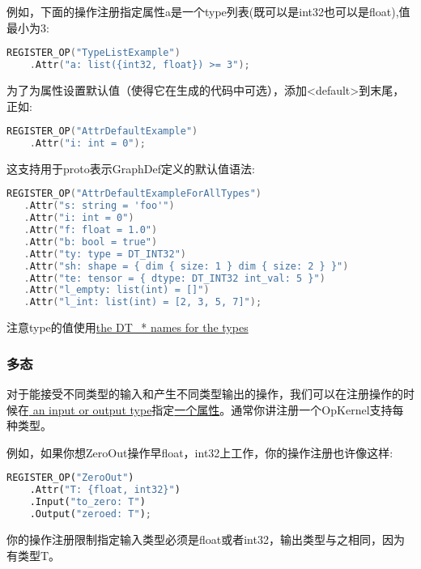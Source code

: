 例如，下面的操作注册指定属性a是一个type列表(既可以是int32也可以是float),值最小为3:
\begin{lstlisting}[language=C++]
REGISTER_OP("TypeListExample")
    .Attr("a: list({int32, float}) >= 3");
\end{lstlisting}
为了为属性设置默认值（使得它在生成的代码中可选），添加<default>到末尾，正如:
\begin{lstlisting}[language=C++]
REGISTER_OP("AttrDefaultExample")
    .Attr("i: int = 0");

\end{lstlisting}
这支持用于proto表示GraphDef定义的默认值语法:
\begin{lstlisting}[language=C++]
REGISTER_OP("AttrDefaultExampleForAllTypes")
   .Attr("s: string = 'foo'")
   .Attr("i: int = 0")
   .Attr("f: float = 1.0")
   .Attr("b: bool = true")
   .Attr("ty: type = DT_INT32")
   .Attr("sh: shape = { dim { size: 1 } dim { size: 2 } }")
   .Attr("te: tensor = { dtype: DT_INT32 int_val: 5 }")
   .Attr("l_empty: list(int) = []")
   .Attr("l_int: list(int) = [2, 3, 5, 7]");

\end{lstlisting}
注意type的值使用\href{https://www.tensorflow.org/api_docs/python/tf/DType?hl=zh-cn}{the DT\_* names for the types}
\subsubsection{多态}
对于能接受不同类型的输入和产生不同类型输出的操作，我们可以在注册操作的时候在\href{https://www.tensorflow.org/extend/adding_an_op?hl=zh-cn#inputs_and_outputs}{ an input or output type}指定\href{https://www.tensorflow.org/extend/adding_an_op?hl=zh-cn#attrs}{一个属性}。通常你讲注册一个OpKernel支持每种类型。

例如，如果你想ZeroOut操作早float，int32上工作，你的操作注册也许像这样:
\begin{lstlisting}[language=Python]
REGISTER_OP("ZeroOut")
    .Attr("T: {float, int32}")
    .Input("to_zero: T")
    .Output("zeroed: T");

\end{lstlisting}
你的操作注册限制指定输入类型必须是float或者int32，输出类型与之相同，因为有类型T。

